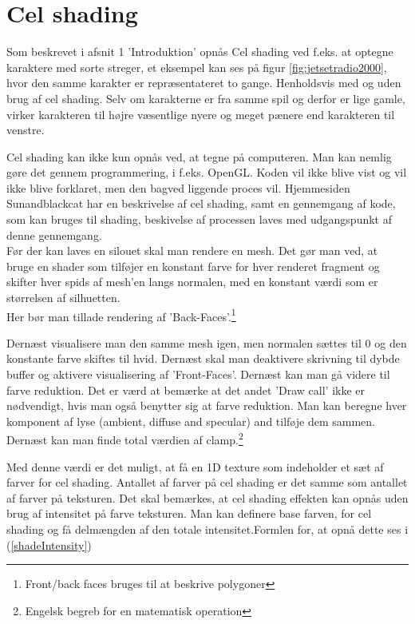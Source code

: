 \section{Cel shading}
Som beskrevet i afsnit 1 'Introduktion' opnås Cel shading ved f.eks. at optegne karaktere med sorte streger, et eksempel kan ses på figur \ref{fig:jetsetradio2000}, hvor den samme karakter er repræsentateret to gange. Henholdsvis med og uden brug af cel shading. Selv om karakterne er fra samme spil og derfor er lige gamle, virker karakteren til højre væsentlige nyere og meget pænere end karakteren til venstre. 

Cel shading kan ikke kun opnås ved, at tegne på computeren. Man kan nemlig gøre det gennem programmering, i f.eks. OpenGL. Koden vil ikke blive vist og vil ikke blive forklaret, men den bagved liggende proces vil. Hjemmesiden Sunandblackcat \cite{sunandblackcat2016} har en beskrivelse af cel shading, samt en gennemgang af kode, som kan bruges til shading, beskivelse af processen laves med udgangspunkt af denne gennemgang.\\
Før der kan laves en silouet skal man rendere en mesh. Det gør man ved, at bruge en shader som tilføjer en konstant farve for hver renderet fragment og skifter hver spids af mesh’en langs normalen, med en konstant værdi som er størrelsen af silhuetten.\\ Her bør man tillade rendering af ’Back-Faces’.\footnote[1]{Front/back faces bruges til at beskrive polygoner}

Dernæst visualisere man den samme mesh igen, men normalen sættes til 0 og den konstante farve skiftes til hvid.  Dernæst skal man deaktivere skrivning til dybde buffer og aktivere visualisering af ’Front-Faces’. Dernæst kan man gå videre til farve reduktion. Det er værd at bemærke at det andet ’Draw call’ ikke er nødvendigt, hvis man også benytter sig at farve reduktion. 
Man kan beregne hver komponent af lyse (ambient, diffuse and specular) and tilføje dem sammen. Dernæst kan man finde total værdien af clamp.\footnote[2]{Engelsk begreb for en matematisk operation}

Med denne værdi er det muligt, at få en 1D texture som indeholder et sæt af farver for cel shading. Antallet af farver på cel shading er det samme som antallet af farver på teksturen. Det skal bemærkes, at cel shading effekten kan opnås uden brug af intensitet på farve teksturen. 
Man kan definere base farven, for cel shading og få delmængden af den totale intensitet.Formlen for, at opnå dette ses i (\ref{shadeIntensity})
 
